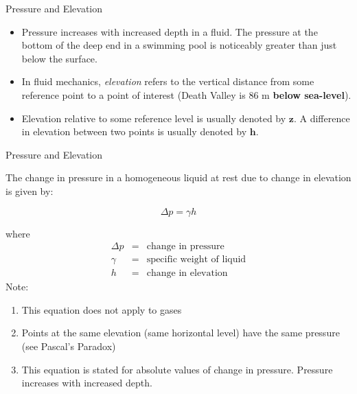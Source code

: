\documentclass[9pt,xcolor={svgnames, x11names},professionalfonts, mathserif]{beamer}
\begin{document}
\begin{frame}{Pressure and Elevation}
 \begin{itemize}
  \item Pressure increases with increased depth in a fluid. The pressure at
        the bottom of the deep end in a swimming pool is noticeably greater
        than just below the surface. \pause\parb
  \item In fluid mechanics, \emph{elevation} refers to the vertical distance
        from some reference point to a point of interest (Death Valley is
        86 m \textbf{below sea-level}). \pause\parb
  \item Elevation relative to some reference level is usually denoted by $\bm z$. \lb A difference in elevation between two points is usually denoted by $\bm h$.
 \end{itemize}
\end{frame}

\begin{frame}{Pressure and Elevation}


 The change in pressure in a homogeneous liquid at rest due to change
 in elevation is given by:
 \begin{center}
  \begin{mybox}[width=4cm]
   \[\Delta p=\gamma h\]
  \end{mybox}
 \end{center}

 where
 \vspace{-0.5cm}
 \begin{eqnarray*}
  \Delta p & = & \text{change  in  pressure}\\
  \gamma & = & \text{specific weight of  liquid}\\
  h & = & \text{change in elevation}
 \end{eqnarray*} \pause
 Note:
 \begin{enumerate}
  \item This equation does not apply to gases
  \item Points at the same elevation (same horizontal level) have the same
        pressure (see Pascal's Paradox)
  \item This equation is stated for absolute values of change in pressure. \lb Pressure increases with increased depth.
 \end{enumerate}

\end{frame}
\end{document}
